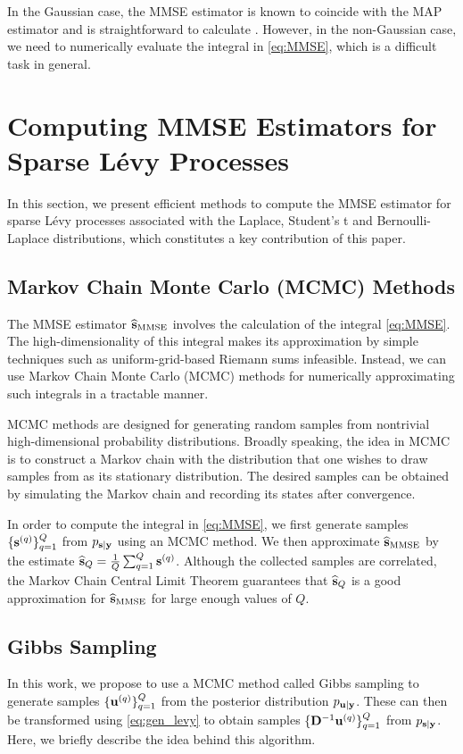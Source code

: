 \documentclass[journal]{IEEEtran}
\begin{document}
In the Gaussian case, the MMSE estimator is known to coincide with the MAP estimator and is straightforward to calculate \cite{kay1993fundamentals,unser2019biomedical}. However, in the non-Gaussian case, we need to numerically evaluate the integral in \eqref{eq:MMSE}, which is a difficult task in general. 


\section{Computing MMSE Estimators for Sparse L\'{e}vy Processes}
In this section, we present efficient methods to compute the MMSE estimator for sparse L\'{e}vy processes associated with the Laplace, Student's t and Bernoulli-Laplace distributions, which constitutes a key contribution of this paper.

\subsection{Markov Chain Monte Carlo (MCMC) Methods}
The MMSE estimator $\widehat{{\bf{s}}}_{\text{MMSE}}$ involves the calculation of the integral \eqref{eq:MMSE}. The high-dimensionality of this integral makes its approximation by simple techniques such as uniform-grid-based Riemann sums infeasible. Instead, we can use Markov Chain Monte Carlo (MCMC) methods \cite{hastings1970monte, geyer1992practical,gilks1995markov,gamerman2006markov} for numerically approximating such integrals in a tractable manner.

MCMC methods are designed for generating random samples from nontrivial high-dimensional probability distributions. Broadly speaking, the idea in MCMC is to construct a Markov chain with the distribution that one wishes to draw samples from as its stationary distribution. The desired samples can be obtained by simulating the Markov chain and recording its states after convergence.

In order to compute the integral in \eqref{eq:MMSE}, we first generate samples $\{{\bf{s}}^{(q)}\}_{q=1}^{Q}$ from $p_{{\bf{s}} | {\bf{y}}}$ using an MCMC method. We then approximate $\widehat{{\bf{s}}}_{\text{MMSE}}$ by the estimate $\widehat{{\bf{s}}}_{Q} = \frac{1}{Q} \sum_{q=1}^{Q} {\bf{s}}^{(q)}$. Although the collected samples are correlated, the Markov Chain Central Limit Theorem \cite{gordin1978central} guarantees that $\widehat{{\bf{s}}}_{Q}$ is a good approximation for $\widehat{{\bf{s}}}_{\text{MMSE}}$ for large enough values of $Q$. 


\subsection{Gibbs Sampling}
In this work, we propose to use a MCMC method called Gibbs sampling \cite{geman1984stochastic,casella1992explaining} to generate samples $\{{\bf{u}}^{(q)}\}_{q=1}^{Q}$ from the posterior distribution $p_{{\bf{u}} | {\bf{y}}}$. These can then be transformed using \eqref{eq:gen_levy} to obtain samples $\{{\bf{D}}^{-1} {\bf{u}}^{(q)}\}_{q=1}^{Q}$ from $p_{{\bf{s}} | {\bf{y}}}$. Here, we briefly describe the idea behind this algorithm. 
\end{document}
